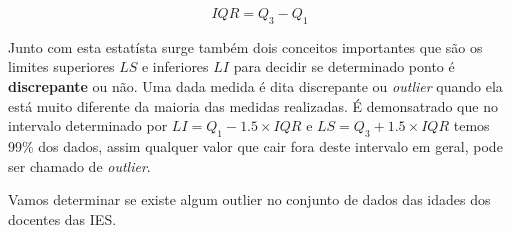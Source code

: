 \documentclass[12pt,]{style/krantz}
\makeatletter
\newenvironment{Shaded}{\begin{snugshade}}{\end{snugshade}}
\newcommand{\DataTypeTok}[1]{\textcolor[rgb]{0.13,0.29,0.53}{#1}}
\newcommand{\DecValTok}[1]{\textcolor[rgb]{0.00,0.00,0.81}{#1}}
\newcommand{\FloatTok}[1]{\textcolor[rgb]{0.00,0.00,0.81}{#1}}
\newcommand{\KeywordTok}[1]{\textcolor[rgb]{0.13,0.29,0.53}{\textbf{#1}}}
\newcommand{\NormalTok}[1]{#1}
\newcommand{\OperatorTok}[1]{\textcolor[rgb]{0.81,0.36,0.00}{\textbf{#1}}}
\newcommand{\OtherTok}[1]{\textcolor[rgb]{0.56,0.35,0.01}{#1}}
\newcommand{\StringTok}[1]{\textcolor[rgb]{0.31,0.60,0.02}{#1}}
\newenvironment{kframe}{%
\medskip{}
\setlength{\fboxsep}{.8em}
 \def\at@end@of@kframe{}%
 \ifinner\ifhmode%
  \def\at@end@of@kframe{\end{minipage}}%
  \begin{minipage}{\columnwidth}%
 \fi\fi%
 \def\FrameCommand##1{\hskip\@totalleftmargin \hskip-\fboxsep
 \colorbox{shadecolor}{##1}\hskip-\fboxsep
     \hskip-\linewidth \hskip-\@totalleftmargin \hskip\columnwidth}%
 \MakeFramed {\advance\hsize-\width
   \@totalleftmargin\z@ \linewidth\hsize
   \@setminipage}}%
 {\par\unskip\endMakeFramed%
 \at@end@of@kframe}
\renewenvironment{Shaded}{\begin{kframe}}{\end{kframe}}
\theoremstyle{definition}
\theoremstyle{definition}
\theoremstyle{definition}
\theoremstyle{remark}
\let\BeginKnitrBlock\begin \let\EndKnitrBlock\end
\makeatother
\begin{document}
\[IQR = Q_3-Q_1\]

Junto com esta estatísta surge também dois conceitos importantes que são os limites superiores \(LS\) e inferiores \(LI\) para decidir se determinado ponto é \textbf{discrepante} ou não. Uma dada medida é dita discrepante ou \emph{outlier} quando ela está muito diferente da maioria das medidas realizadas. É demonsatrado que no intervalo determinado por \(LI=Q_1-1.5 \times IQR\) e \(LS=Q_3+1.5 \times IQR\) temos 99\% dos dados, assim qualquer valor que cair fora deste intervalo em geral, pode ser chamado de \emph{outlier}.

\BeginKnitrBlock{example}
\protect\hypertarget{exm:unnamed-chunk-53}{}{\label{exm:unnamed-chunk-53} }Vamos determinar se existe algum outlier no conjunto de dados das idades dos docentes das IES.
\EndKnitrBlock{example}

\begin{Shaded}
\end{Shaded}
\end{document}
